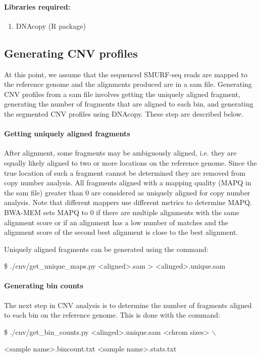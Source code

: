 \documentclass[11pt]{article}
\newenvironment{cmd}
{\list{}{
    \parsep=0em
    \itemindent=17pt
    \listparindent=50pt
    \leftmargin=0in
    \rightmargin=0in
  }\item[] \ttfamily \$}
{\endlist}
\begin{document}
\paragraph{Libraries required:}
\begin{enumerate}
  \item DNAcopy (R package) \cite{seshan2010dnacopy}
\end{enumerate}

\subsection{Generating CNV profiles}
At this point, we assume that the sequenced SMURF-seq reads are mapped to the
reference genome and the alignments produced are in a sam file.
Generating CNV profiles from a sam file involves getting the uniquely aligned
fragment, generating the number of fragments that are aligned to each bin, and
generating the segmented CNV profiles using DNAcopy. These step are described
below.

\paragraph{Getting uniquely aligned fragments}
After alignment, some fragments may be ambiguously aligned, i.e. they are
equally likely aligned to two or more locations on the reference genome.
Since the true location of such a fragment cannot be determined they are
removed from copy number analysis.
All fragments aligned with a mapping quality (MAPQ in the sam file) greater
than 0 are considered as uniquely aligned for copy number analysis.
Note that different mappers use different metrics to determine MAPQ. BWA-MEM
sets MAPQ to 0 if there are multiple alignments with the same alignment score
or if an alignment has a low number of matches and the alignment score of
the second best alignment is close to the best alignment.

Uniquely aligned fragments can be generated using the command:
\begin{cmd}
  ./cnv/get\_unique\_maps.py <aligned>.sam > <alinged>.unique.sam
\end{cmd}

\paragraph{Generating bin counts}
The next step in CNV analysis is to determine the number of fragments
aligned to each bin on the reference genome. This is done with the
command:
\begin{cmd}
  ./cnv/get\_bin\_counts.py <alinged>.unique.sam <chrom sizes> $\backslash$
    \par <bin boundaries> <sample name>.bincount.txt <sample name>.stats.txt
\end{cmd}
\end{document}
